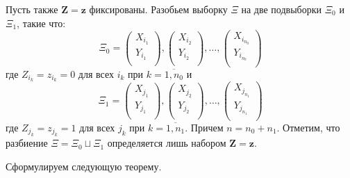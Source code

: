 Пусть также $\mathbf{Z}=\mathbf{z}$ фиксированы. 
Разобьем выборку $\Xi$ на две подвыборки $\Xi_0$ и $\Xi_1$, 
такие что:
$$
\Xi_0=
\begin{pmatrix}
    X_{i_1} \\
    Y_{i_1} \\
\end{pmatrix},
\begin{pmatrix}
    X_{i_2} \\
    Y_{i_2} \\
\end{pmatrix}, \ldots,
\begin{pmatrix}
    X_{i_{n_0}} \\
    Y_{i_{n_0}} \\
\end{pmatrix} 
$$
где $Z_{i_k}=z_{i_k}=0$ для всех $i_k$ при $k=\overline{1,n_0}$ и $$
\Xi_1=
\begin{pmatrix}
    X_{j_1} \\
    Y_{j_1} \\
\end{pmatrix},
\begin{pmatrix}
    X_{j_2} \\
    Y_{j_2} \\
\end{pmatrix}, \ldots,
\begin{pmatrix}
    X_{j_{n_1}} \\
    Y_{j_{n_1}} \\
\end{pmatrix} 
$$
где $Z_{j_k}=z_{j_k}=1$ для всех $j_k$ при $k=\overline{1,n_1}$. 
Причем $n=n_0+n_1$. Отметим, что
разбиение $\Xi = \Xi_0 \sqcup \Xi_1$ определяется лишь набором
$\mathbf{Z}=\mathbf{z}$.

Сформулируем следующую теорему.

